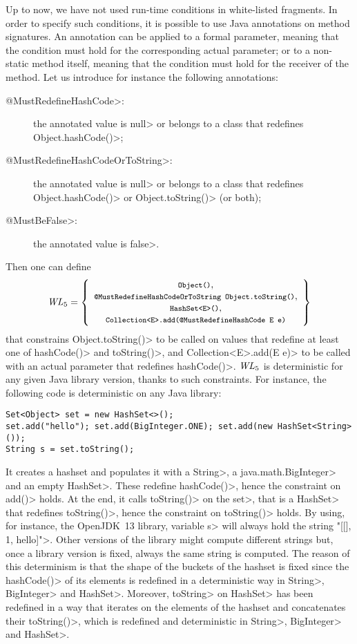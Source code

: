 Up to now, we have not used run-time conditions in white-listed fragments.
In order to specify such conditions, it is possible to use Java annotations on
method signatures. An annotation can be applied to a formal parameter, meaning that
the condition must hold for the corresponding actual parameter; or to a non-static method
itself, meaning that the condition must hold for the receiver of the method.
Let us introduce for instance the following annotations:
%
\begin{description}
\item[\<@MustRedefineHashCode>:] the annotated value is \<null> or belongs to a class that redefines
  \<Object.hashCode()>;
\item[\<@MustRedefineHashCodeOrToString>:] the annotated value is \<null> or belongs to a class that redefines
  \<Object.hashCode()> or \<Object.toString()> (or both);
\item[\<@MustBeFalse>:] the annotated value is \<false>.
\end{description}
%
Then one can define
%
\[
\wl_5=\left\{\begin{array}{c}
\mbox{\<Object()>},\\
\mbox{\<@MustRedefineHashCodeOrToString Object.toString()>},\\
\mbox{\<HashSet$\text{<}$E$\text{>}$()>},\\
\mbox{\<Collection$\text{<}$E$\text{>}$.add(@MustRedefineHashCode E e)>}
\end{array}\right\}
\]
%
that constrains \<Object.toString()> to be called on values that redefine
at least one of \<hashCode()> and \<toString()>, and
\<Collection$\text{<}$E$\text{>}$.add(E e)> to be called
with an actual parameter that redefines \<hashCode()>. $\mathit{WL}_5$ is deterministic
for any given Java library version, thanks
to such constraints. For instance, the following code is deterministic
on any Java library:

{\small\begin{verbatim}
Set<Object> set = new HashSet<>();
set.add("hello"); set.add(BigInteger.ONE); set.add(new HashSet<String>());
String s = set.toString();
\end{verbatim}}

\noindent
It creates a hashset and populates it with a
\<String>, a \<java.math.BigInteger> and an empty \<HashSet>. These
redefine \<hashCode()>, hence the constraint on \<add()> holds.
At the end, it calls \<toString()> on the
\<set>, that is a \<HashSet> that redefines \<toString()>,
hence the constraint
on \<toString()> holds. By using, for instance, the
OpenJDK~13 library, variable \<s> will always hold the string
\<"[[], 1, hello]">. Other versions of the library might compute different strings but,
once a library version is fixed, always the same string is computed.
The reason of this determinism is that the shape of the buckets of the hashset is fixed
since the \<hashCode()> of its elements is redefined in a deterministic way in
\<String>, \<BigInteger> and \<HashSet>. Moreover, \<toString> on \<HashSet> has been
redefined in a way that iterates on the elements of the hashset and concatenates
their \<toString()>, which is redefined and deterministic in
\<String>, \<BigInteger> and \<HashSet>.


